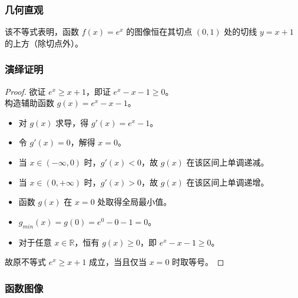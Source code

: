 \documentclass[a4paper,12pt]{ctexart}
\theoremstyle{mytheoremstyle}
\begin{document}
\subsubsection*{\textcolor{MyGreen}{几何直观}}
该不等式表明，函数 $f(x) = e^x$ 的图像恒在其切点 $(0, 1)$ 处的切线 $y = x+1$ 的上方（除切点外）。

\subsubsection*{\textcolor{MyGreen}{演绎证明}}
\begin{proof}
欲证 $e^x \ge x+1$，即证 $e^x - x - 1 \ge 0$。\\
构造辅助函数 $g(x) = e^x - x - 1$。
\begin{itemize}
    \item[∵] 对 $g(x)$ 求导，得 $g'(x) = e^x - 1$。
    \item[∵] 令 $g'(x) = 0$，解得 $x=0$。
    \item[∵] 当 $x \in (-\infty, 0)$ 时，$g'(x) < 0$，故 $g(x)$ 在该区间上单调递减。
    \item[∵] 当 $x \in (0, +\infty)$ 时，$g'(x) > 0$，故 $g(x)$ 在该区间上单调递增。
    \item[∴] 函数 $g(x)$ 在 $x=0$ 处取得全局最小值。
    \item[∵] $g_{min}(x) = g(0) = e^0 - 0 - 1 = 0$。
    \item[∴] 对于任意 $x \in \mathbb{R}$，恒有 $g(x) \ge 0$，即 $e^x - x - 1 \ge 0$。
\end{itemize}
故原不等式 $e^x \ge x+1$ 成立，当且仅当 $x=0$ 时取等号。
\end{proof}

\subsubsection*{\textcolor{MyGreen}{函数图像}}
\begin{center}
\end{center}
\end{document}

